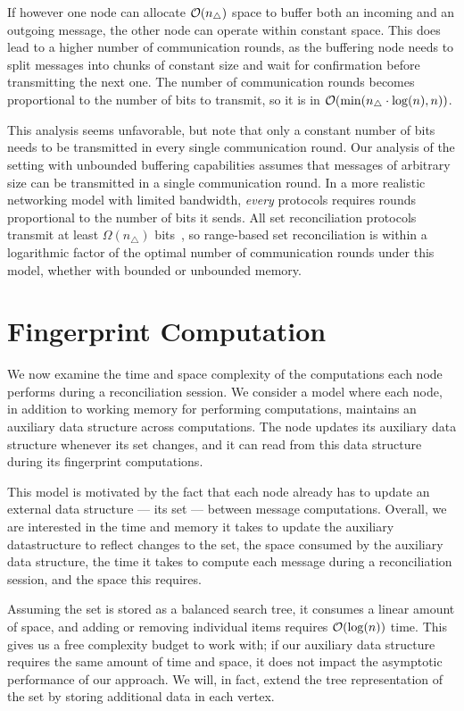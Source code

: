 \documentclass[conference]{IEEEtran}
\begin{document}
If however one node can allocate $\mathcal{O}(n_{\triangle})$ space to buffer both an incoming and an outgoing message, the other node can operate within constant space. This does lead to a higher number of communication rounds, as the buffering node needs to split messages into chunks of constant size and wait for confirmation before transmitting the next one. The number of communication rounds becomes proportional to the number of bits to transmit, so it is in $\mathcal{O}(\min(n_{\triangle} \cdot \log(n), n))$.

This analysis seems unfavorable, but note that only a constant number of bits needs to be transmitted in every single communication round. Our analysis of the setting with unbounded buffering capabilities assumes that messages of arbitrary size can be transmitted in a single communication round. In a more realistic networking model with limited bandwidth, \textit{every} protocols requires rounds proportional to the number of bits it sends. All set reconciliation protocols transmit at least $\Omega(n_{\triangle})$ bits~\cite{minsky2003set}, so range-based set reconciliation is within a logarithmic factor of the optimal number of communication rounds under this model, whether with bounded or unbounded memory.

\section{Fingerprint Computation}\label{sec:computation}

We now examine the time and space complexity of the computations each node performs during a reconciliation session. We consider a model where each node, in addition to working memory for performing computations, maintains an auxiliary data structure across computations. The node updates its auxiliary data structure whenever its set changes, and it can read from this data structure during its fingerprint computations.

This model is motivated by the fact that each node already has to update an external data structure --- its set  --- between message computations. Overall, we are interested in the time and memory it takes to update the auxiliary datastructure to reflect changes to the set, the space consumed by the auxiliary data structure, the time it takes to compute each message during a reconciliation session, and the space this requires.

Assuming the set is stored as a balanced search tree, it consumes a linear amount of space, and adding or removing individual items requires $\mathcal{O}(\log(n))$ time. This gives us a free complexity budget to work with; if our auxiliary data structure requires the same amount of time and space, it does not impact the asymptotic performance of our approach. We will, in fact, extend the tree representation of the set by storing additional data in each vertex.
\end{document}
